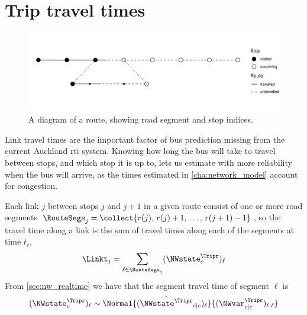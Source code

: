\section{Trip travel times}
\label{sec:trip_state_link}


\begin{knitrout}
\color{fgcolor}\begin{figure}
\includegraphics[width=\maxwidth]{figure/trip_segments-1} \caption[A diagram of a route, showing road segment and stop indices]{A diagram of a route, showing road segment and stop indices.}\label{fig:trip_segments}
\end{figure}


\end{knitrout}





Link travel times are the important factor of bus prediction
missing from the current Auckland \gls{rti} system.
Knowing how long the bus will take to travel between stops,
and which stop it is up to,
lets us estimate with more reliability when the bus will arrive,
as the times estimated in \cref{cha:network_model}
account for \rt{} congestion.


Each link $j$ between stops $j$ and $j+1$ in a given route
consist of one or more road segments
$\RouteSegs_j = \collect{r(j),\,r(j)+1,\, \ldots,\, r(j+1) - 1}$,
so the travel time along a link
is the sum of travel times along each of the segments
at time $t_c$,
\begin{equation}
\label{eq:link_tt}
\Linkt_{j} = \sum_{\ell\in\RouteSegs_j} (\NWstate^\Tripr_c)_\ell
\end{equation}
From \cref{sec:nw_realtime} we have that
the segment travel time of segment $\ell$ is
\begin{equation}
\label{eq:seg_tt_dist}
(\NWstate^\Tripr_c)_\ell \sim
\Normal{(\hat{\NWstate^\Tripr}_{c|c})_\ell}%
{(\NWvar^\Tripr_{c|c})_{\ell,\ell}}
\end{equation}

